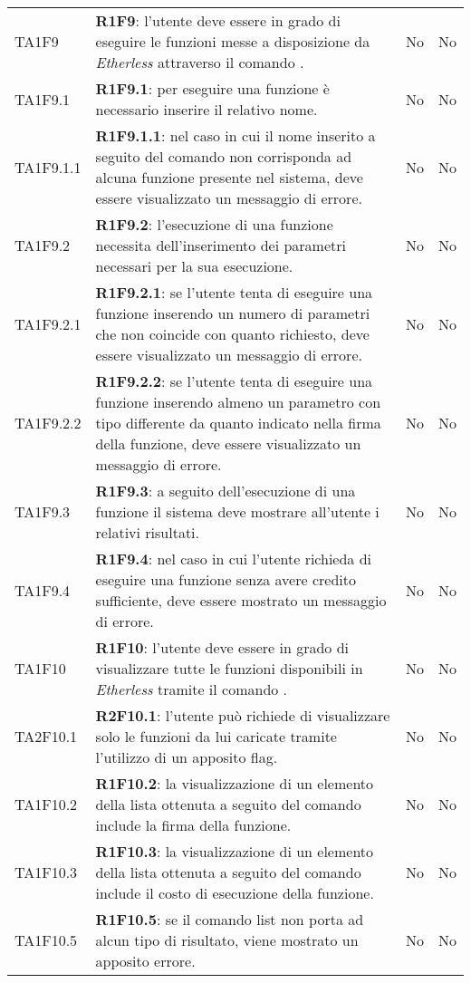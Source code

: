 \begin{longtable}{
		>{\centering}p{} 
		>{}p{}
		>{\centering}p{}
		>{\centering}p{} }
	TA1F9 		& \textbf{R1F9}: l'utente deve essere in grado di eseguire le funzioni messe a disposizione da \textit{Etherless} attraverso il comando \run{}.											& No & No \tabularnewline
	TA1F9.1 		& \textbf{R1F9.1}: per eseguire una funzione è necessario inserire il relativo nome. 																										& No & No \tabularnewline
	TA1F9.1.1 	& \textbf{R1F9.1.1}: nel caso in cui il nome inserito a seguito del comando \run{} non corrisponda ad alcuna funzione presente nel sistema, deve essere visualizzato un messaggio di errore. & No & No \tabularnewline
	TA1F9.2 		& \textbf{R1F9.2}: l'esecuzione di una funzione necessita dell'inserimento dei parametri necessari per la sua esecuzione.																	& No & No \tabularnewline
	TA1F9.2.1	& \textbf{R1F9.2.1}: se l'utente tenta di eseguire una funzione inserendo un numero di parametri che non coincide con quanto richiesto, deve essere visualizzato un messaggio di errore. 	& No & No \tabularnewline
	TA1F9.2.2 	& \textbf{R1F9.2.2}: se l'utente tenta di eseguire una funzione inserendo almeno un parametro con tipo differente da quanto indicato nella firma della funzione, deve essere visualizzato un messaggio di errore. & No & No \tabularnewline
	TA1F9.3 		& \textbf{R1F9.3}: a seguito dell'esecuzione di una funzione il sistema deve mostrare all'utente i relativi risultati. 																	& No & No \tabularnewline
	TA1F9.4 		& \textbf{R1F9.4}: nel caso in cui l'utente richieda di eseguire una funzione senza avere credito sufficiente, deve essere mostrato un messaggio di errore.								& No & No \tabularnewline

	TA1F10 		& \textbf{R1F10}: l'utente deve essere in grado di visualizzare tutte le funzioni disponibili in \textit{Etherless} tramite il comando \lista{}. 										& No & No \tabularnewline
	TA2F10.1 	& \textbf{R2F10.1}: l'utente può richiede di visualizzare solo le funzioni da lui caricate tramite l'utilizzo di un apposito flag.															& No & No \tabularnewline
	TA1F10.2 	& \textbf{R1F10.2}: la visualizzazione di un elemento della lista ottenuta a seguito del comando \lista{} include la firma della funzione. 												& No & No \tabularnewline
	TA1F10.3 	& \textbf{R1F10.3}: la visualizzazione di un elemento della lista ottenuta a seguito del comando \lista{} include il costo di esecuzione della funzione. 									& No & No \tabularnewline
	TA1F10.5	& \textbf{R1F10.5}: se il comando list non porta ad alcun tipo di risultato, viene mostrato un apposito errore. 																			& No & No \tabularnewline


\end{longtable}
